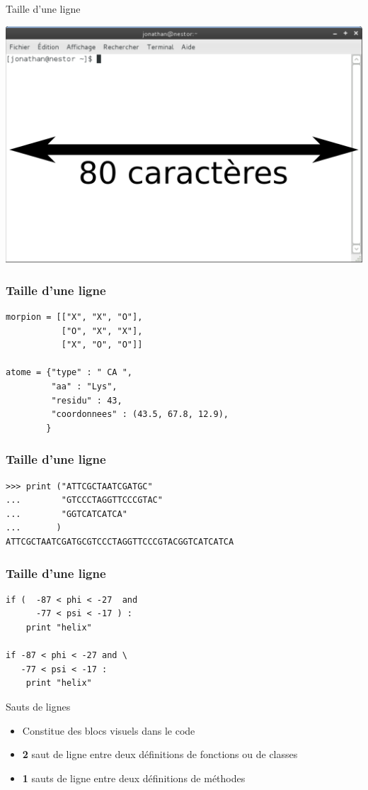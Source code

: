 \documentclass[xcolor=pdftex,dvipsnames,table,handout]{beamer}
\begin{document}
\begin{frame}{Taille d'une ligne}
\begin{center}
\includegraphics[width=0.7\linewidth]{img/Capture-Terminal.pdf}
\end{center}
\end{frame}

\begin{frame}[fragile]
\frametitle{Taille d'une ligne}
\begin{lstlisting}
morpion = [["X", "X", "O"],
           ["O", "X", "X"],
           ["X", "O", "O"]]

atome = {"type" : " CA ",
         "aa" : "Lys",
         "residu" : 43,
         "coordonnees" : (43.5, 67.8, 12.9),
        }
\end{lstlisting}
\end{frame}

\begin{frame}[fragile]
\frametitle{Taille d'une ligne}
\begin{lstlisting}
>>> print ("ATTCGCTAATCGATGC"
...        "GTCCCTAGGTTCCCGTAC"
...        "GGTCATCATCA"
...       )
ATTCGCTAATCGATGCGTCCCTAGGTTCCCGTACGGTCATCATCA
\end{lstlisting}
\end{frame}

\begin{frame}[fragile]
\frametitle{Taille d'une ligne}
\begin{lstlisting}
if (  -87 < phi < -27  and 
      -77 < psi < -17 ) :
    print "helix"

if -87 < phi < -27 and \
   -77 < psi < -17 :
    print "helix"
\end{lstlisting}
\end{frame}

\begin{frame}{Sauts de lignes}
\begin{itemize}
    \item Constitue des blocs visuels dans le code
    \item \textbf{2} saut de ligne entre deux définitions de fonctions ou de classes
    \item \textbf{1} sauts de ligne entre deux définitions de méthodes
\end{itemize}
\end{frame}
\end{document}
